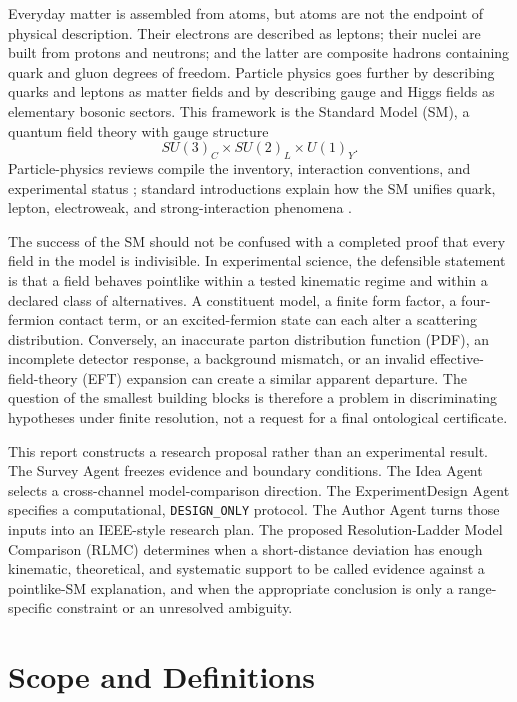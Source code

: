 \documentclass[conference]{../../../../Conference-LaTeX-template_10-17-19/IEEEtran}
\begin{document}
Everyday matter is assembled from atoms, but atoms are not the endpoint of physical description. Their electrons are described as leptons; their nuclei are built from protons and neutrons; and the latter are composite hadrons containing quark and gluon degrees of freedom. Particle physics goes further by describing quarks and leptons as matter fields and by describing gauge and Higgs fields as elementary bosonic sectors. This framework is the Standard Model (SM), a quantum field theory with gauge structure
\begin{equation}
SU(3)_{C}\times SU(2)_{L}\times U(1)_{Y}.
\label{eq:gaugegroup}
\end{equation}
Particle-physics reviews compile the inventory, interaction conventions, and experimental status \cite{pdg2008}; standard introductions explain how the SM unifies quark, lepton, electroweak, and strong-interaction phenomena \cite{cottingham2007}.

The success of the SM should not be confused with a completed proof that every field in the model is indivisible. In experimental science, the defensible statement is that a field behaves pointlike within a tested kinematic regime and within a declared class of alternatives. A constituent model, a finite form factor, a four-fermion contact term, or an excited-fermion state can each alter a scattering distribution. Conversely, an inaccurate parton distribution function (PDF), an incomplete detector response, a background mismatch, or an invalid effective-field-theory (EFT) expansion can create a similar apparent departure. The question of the smallest building blocks is therefore a problem in discriminating hypotheses under finite resolution, not a request for a final ontological certificate.

This report constructs a research proposal rather than an experimental result. The Survey Agent freezes evidence and boundary conditions. The Idea Agent selects a cross-channel model-comparison direction. The ExperimentDesign Agent specifies a computational, \texttt{DESIGN\_ONLY} protocol. The Author Agent turns those inputs into an IEEE-style research plan. The proposed Resolution-Ladder Model Comparison (RLMC) determines when a short-distance deviation has enough kinematic, theoretical, and systematic support to be called evidence against a pointlike-SM explanation, and when the appropriate conclusion is only a range-specific constraint or an unresolved ambiguity.

\section{Scope and Definitions}
\end{document}
